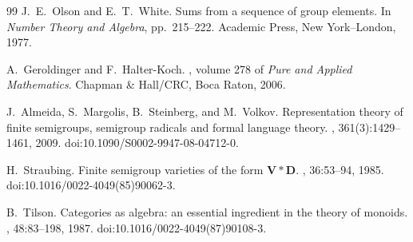 \documentclass[11pt,a4paper]{ltjsarticle}
\numberwithin{equation}{section}
\theoremstyle{plain}
\theoremstyle{definition}
\theoremstyle{remark}
\theoremstyle{plain}
\begin{document}
\begin{thebibliography}{99}
J.~E.~Olson and E.~T.~White.
\newblock Sums from a sequence of group elements.
\newblock In \emph{Number Theory and Algebra}, pp.~215--222.
Academic Press, New York--London, 1977.

A.~Geroldinger and F.~Halter-Koch.
, volume 278 of {\em Pure and Applied Mathematics}.
\newblock Chapman \& Hall/CRC, Boca Raton, 2006.

J.~Almeida, S.~Margolis, B.~Steinberg, and M.~Volkov.
\newblock Representation theory of finite semigroups, semigroup radicals and
formal language theory.
,
361(3):1429--1461, 2009.
\newblock doi:10.1090/S0002-9947-08-04712-0.

H.~Straubing.
\newblock Finite semigroup varieties of the form $\mathbf V*\mathbf D$.
, 36:53--94, 1985.
\newblock doi:10.1016/0022-4049(85)90062-3.

B.~Tilson.
\newblock Categories as algebra: an essential ingredient in the theory of monoids.
, 48:83--198, 1987.
\newblock doi:10.1016/0022-4049(87)90108-3.

\end{thebibliography}
\normalsize
\end{document}
